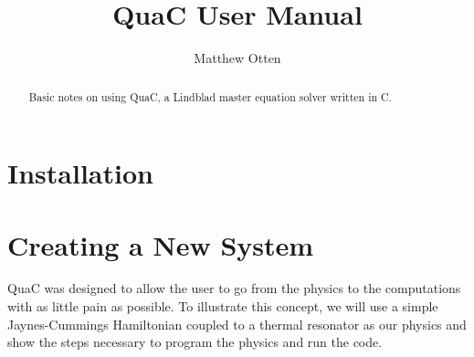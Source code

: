 \documentclass{article}
\begin{document}

\title{QuaC User Manual}
\author{Matthew Otten}

\maketitle

\begin{abstract}
  Basic notes on using QuaC, a Lindblad master equation solver written in C.
\end{abstract}

\section{Installation}

\section{Creating a New System}
QuaC was designed to allow the user to go from the physics to the computations with
as little pain as possible. To illustrate this concept, we will use a simple
Jaynes-Cummings Hamiltonian coupled to a thermal resonator
as our physics and show the steps necessary to
program the physics and run the code.
\end{document}
